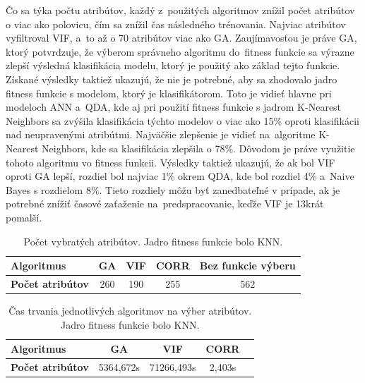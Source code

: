 \documentclass[runningheads]{llncs}
\begin{document}
Čo sa týka počtu atribútov, každý z~použitých algoritmov znížil počet atribútov o viac ako polovicu, čím sa znížil čas následného 
trénovania. Najviac atribútov vyfiltroval VIF, a~to až o 70 atribútov viac ako GA. 
Zaujímavosťou je práve GA, ktorý potvrdzuje, že výberom správneho algoritmu 
do~fitness funkcie sa výrazne zlepší výsledná klasifikácia modelu, ktorý je použitý
ako základ tejto funkcie. Získané výsledky taktiež ukazujú, že nie je potrebné, aby sa 
zhodovalo jadro fitness funkcie s modelom, ktorý je klasifikátorom. Toto je vidieť 
hlavne pri modeloch ANN a~QDA, kde aj pri použití fitness funkcie s jadrom 
K-Nearest Neighbors sa zvýšila klasifikácia týchto modelov o viac ako 15\% oproti 
klasifikácii nad neupravenými atribútmi. Najväčšie zlepšenie je vidieť na~algoritme 
K-Nearest Neighbors, kde sa klasifikácia zlepšila o 78\%. Dôvodom je práve využitie tohoto algoritmu vo fitness funkcii.
Výsledky taktiež ukazujú, že ak bol VIF oproti GA lepší, rozdiel bol najviac 1\% okrem QDA, 
kde bol rozdiel 4\% a~Naive Bayes s rozdielom 8\%. Tieto rozdiely môžu byť zanedbateľné v prípade, ak
je potrebné znížiť časové zaťaženie na~predspracovanie, keďže VIF je 13krát pomalší.

\begin{table}[]
    \centering
    \caption{Počet vybratých atribútov. Jadro fitness funkcie bolo KNN.}\label{tab_pocet_vyber_atributov}
    \begin{tabular}{|l|c|c|c|c|}
    \hline
    \textbf{Algoritmus}                  & GA        & VIF         & CORR          & Bez funkcie výberu \\ \hline
    \textbf{Počet atribútov}            & 260        & 190         & 255          & 562 \\ \hline
    \end{tabular}
\end{table}

\begin{table}[]
    \centering
    \caption{Čas trvania jednotlivých algoritmov na výber atribútov. Jadro fitness funkcie bolo KNN.}\label{tab_cas_vyber_atributov}
    \begin{tabular}{|l|c|c|c|c|}
    \hline
    \textbf{Algoritmus}                  & GA        & VIF         & CORR         \\ \hline
    \textbf{Počet atribútov}            & 5364,672s        & 71266,493s         & 2,403s \\ \hline
    \end{tabular}
\end{table}
\end{document}
